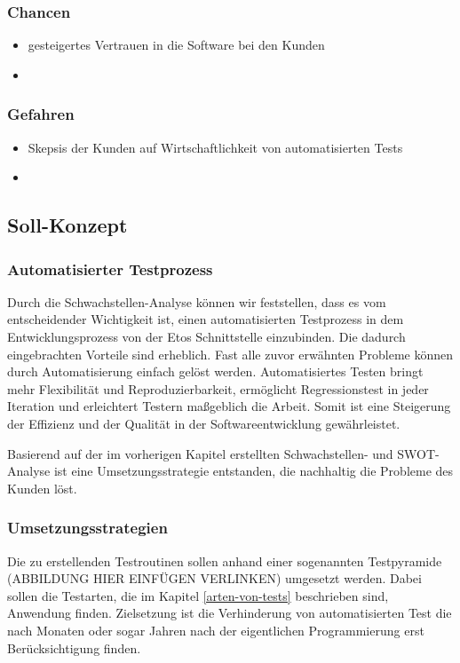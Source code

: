\subsubsection{Chancen}
\begin{itemize}	
	\item gesteigertes Vertrauen in die Software bei den Kunden
	
	\item 
	
\end{itemize}
\subsubsection{Gefahren}
\begin{itemize}	
	\item Skepsis der Kunden auf Wirtschaftlichkeit von automatisierten Tests
	
	\item 
	
\end{itemize}

\subsection{Soll-Konzept}
\subsubsection{Automatisierter Testprozess}
Durch die Schwachstellen-Analyse können wir feststellen, dass es vom entscheidender Wichtigkeit
ist, einen automatisierten Testprozess in dem Entwicklungsprozess von der Etos Schnittstelle einzubinden. Die dadurch eingebrachten Vorteile sind erheblich. Fast alle zuvor erwähnten Probleme können durch Automatisierung einfach gelöst werden. Automatisiertes Testen bringt mehr Flexibilität und Reproduzierbarkeit, ermöglicht Regressionstest in jeder Iteration und erleichtert Testern maßgeblich die Arbeit. Somit ist eine Steigerung der Effizienz und der Qualität in der Softwareentwicklung gewährleistet.

Basierend auf der im vorherigen Kapitel erstellten Schwachstellen- und SWOT-Analyse ist eine Umsetzungsstrategie entstanden, die nachhaltig die Probleme des Kunden löst.

\subsubsection{Umsetzungsstrategien}
Die zu erstellenden Testroutinen sollen anhand einer sogenannten Testpyramide (ABBILDUNG HIER EINFÜGEN VERLINKEN) umgesetzt werden. Dabei sollen die Testarten, die im Kapitel \ref{arten-von-tests} beschrieben sind, Anwendung finden. Zielsetzung ist die Verhinderung von automatisierten Test die nach Monaten oder sogar Jahren nach der eigentlichen Programmierung erst Berücksichtigung finden.

